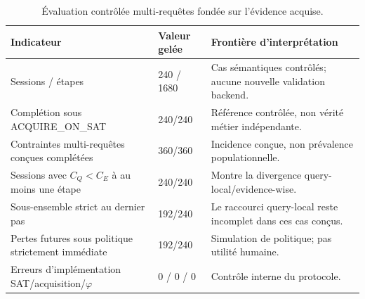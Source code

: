 \begin{table}[t]
\centering
\caption{Évaluation contrôlée multi-requêtes fondée sur l'évidence acquise.}
\label{tab:v88-r2-multiquery}
\small
\begin{tabular}{p{}p{}p{}}
\hline
Indicateur & Valeur gelée & Frontière d'interprétation \\
\hline
Sessions / étapes & 240 / 1680 & Cas sémantiques contrôlés; aucune nouvelle validation backend. \\
Complétion sous ACQUIRE\_ON\_SAT & 240/240 & Référence contrôlée, non vérité métier indépendante. \\
Contraintes multi-requêtes conçues complétées & 360/360 & Incidence conçue, non prévalence populationnelle. \\
Sessions avec $C_Q<C_E$ à au moins une étape & 240/240 & Montre la divergence query-local/evidence-wise. \\
Sous-ensemble strict au dernier pas & 192/240 & Le raccourci query-local reste incomplet dans ces cas conçus. \\
Pertes futures sous politique strictement immédiate & 192/240 & Simulation de politique; pas utilité humaine. \\
Erreurs d'implémentation SAT/acquisition/$\varphi$ & 0 / 0 / 0 & Contrôle interne du protocole. \\
\hline
\end{tabular}
\end{table}
